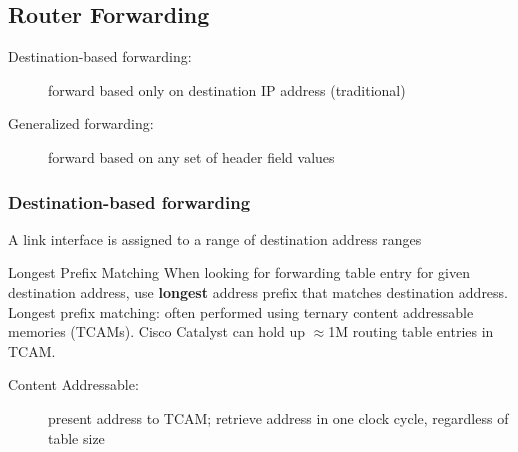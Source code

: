 \subsection{Router Forwarding}
\begin{description}
	\item[Destination-based forwarding:] forward based only on destination IP address (traditional)
	\item[Generalized forwarding:] forward based on any set of header field values
\end{description}
\subsubsection{Destination-based forwarding}
A link interface is assigned to a range of destination address ranges\newpage
\begin{note}{Longest Prefix Matching}
	When looking for forwarding table entry for given destination address, use \textbf{longest} address prefix that matches destination address. Longest prefix matching: often performed using ternary content addressable memories (TCAMs). Cisco Catalyst can hold up $\approx$1M routing table entries in TCAM.
\end{note}
\begin{description}
	\item[Content Addressable:] present address to TCAM; retrieve address in one clock cycle, regardless of table size
\end{description}
